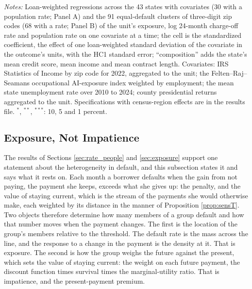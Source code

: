 \begin{table}[H]
\centering
\caption{What the geography of exposure, default and the population rate is correlated with}
\label{tab:geo_correlates}
\footnotesize
\resizebox{\textwidth}{!}{}
\vspace{0.5em}
\begin{minipage}{0.95\textwidth}
\noindent \small \textit{Notes:} Loan-weighted regressions across the 43 states with covariates (30 with a population rate; Panel A) and the 91 equal-default clusters of three-digit zip codes (68 with a rate; Panel B) of the unit's exposure, log 24-month charge-off rate and population rate on one covariate at a time; the cell is the standardized coefficient, the effect of one loan-weighted standard deviation of the covariate in the outcome's units, with the HC1 standard error; ``composition'' adds the state's mean credit score, mean income and mean contract length. Covariates: IRS Statistics of Income by zip code for 2022, aggregated to the unit; the Felten--Raj--Seamans occupational AI-exposure index weighted by employment; the mean state unemployment rate over 2010 to 2024; county presidential returns aggregated to the unit. Specifications with census-region effects are in the results file. $^{*}$, $^{**}$, $^{***}$: 10, 5 and 1 percent.
\end{minipage}
\end{table}

\subsection{Exposure, Not Impatience}\label{sec:exposure_not_impatience}

The results of Sections \ref{sec:rate_people} and \ref{sec:exposure} support one statement about the heterogeneity in default, and this subsection states it and says what it rests on. Each month a borrower defaults when the gain from not paying, the payment she keeps, exceeds what she gives up: the penalty, and the value of staying current, which is the stream of the payments she would otherwise make, each weighted by its distance in the manner of Proposition \ref{prop:sensT}. Two objects therefore determine how many members of a group default and how that number moves when the payment changes. The first is the location of the group's members relative to the threshold. The default rate is the mass across the line, and the response to a change in the payment is the density at it. That is exposure. The second is how the group weighs the future against the present, which sets the value of staying current: the weight on each future payment, the discount function times survival times the marginal-utility ratio. That is impatience, and the present-payment premium.

